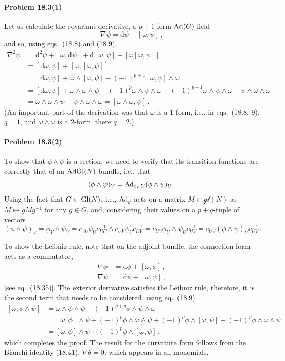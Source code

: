 \documentclass[a4paper,12pt]{article}
\def\d{\mathrm{d}}
\newcommand{\problem}[1]{\paragraph{Problem #1}}
\begin{document}
\problem{18.3(1)} Let us calculate the covariant derivative, a $p+1$-form ${\rm Ad}(G)$ field
\[
 \nabla \psi = \d \psi + [\omega, \psi]\,,
\]
and so, using eqs.\ (18.8) and (18.9),
\[
 \begin{aligned}
  \nabla^2 \psi &= \d^2\psi + [\omega, \d \psi] +\d [\omega, \psi] + [\omega [\omega, \psi]]\\
  &= [\d\omega, \psi] + [\omega, [\omega, \psi]] \\
    &= [\d\omega, \psi] + \omega \wedge [\omega, \psi] - (-1)^{p+1}[\omega, \psi] \wedge \omega \\
  &= [\d\omega, \psi] + \omega \wedge \omega \wedge \psi - (-1)^p \omega \wedge \psi \wedge \omega -(-1)^{p+1} \omega \wedge \psi \wedge \omega - \psi\wedge \omega \wedge \omega\\
  &= \omega \wedge \omega \wedge \psi - \psi\wedge \omega\wedge\omega = [\omega\wedge\omega, \psi]\,.
 \end{aligned}
\]
(An important part of the derivation was that $\omega$ is a 1-form, i.e., in eqs.\ (18.8, 9), $q=1$, and $\omega\wedge\omega$ is a 2-form, there $q=2$.)


\problem{18.3(2)} To show that $\phi\wedge\psi$ is a section, we need to verify that its transition functions are correctly that of an ${\rm Ad}{\rm Gl}(N)$ bundle, i.e., that
\[
 (\phi\wedge\psi)_V = {\rm Ad}_{c_VU} (\phi\wedge\psi)_U\,.
\]
Using the fact that $G\subset {\rm Gl}(N)$, i.e., ${\rm Ad}_g$ acts on a matrix $M\in \mathcal{gl}(N)$ as $M\mapsto g M g^{-1}$ for any $g\in G$, and, considering their values on a $p+q$-tuple of vectors
\[
 (\phi\wedge\psi)_V = \phi_V\wedge\psi_V = c_{VU}\phi_U c_{UC}^{-1} \wedge c_{UV}\psi_U c_{UV}^{-1} =c_{UV}\phi_U\wedge\psi_U c_{UV}^{-1} = c_{UV}(\phi\wedge\psi)_U c_{UV}^{-1}\,.
\]

To show the Leibniz rule, note that on the adjoint bundle, the connection form acts as a commutator,
\[
 \begin{aligned}
  \nabla \phi &= \d\phi + [\omega, \phi]\,,\\
  \nabla \psi &= \d\psi + [\omega, \psi]\,,
 \end{aligned}
\]
[see eq.\ (18.35)]. The exterior derivative satisfies the Leibniz rule, therefore, it is the second term that needs to be considered, using eq.\ (18.9)
\[
 \begin{aligned}{}
  [\omega, \phi\wedge\psi] &= \omega \wedge \phi\wedge\psi - (-1)^{p+q} \phi\wedge\psi\wedge\omega\\
  &= [\omega, \phi]\wedge \psi + (-1)^p \phi\wedge\omega\wedge\psi +(-1)^p \phi\wedge[\omega,\psi] -(-1)^p\phi\wedge\omega\wedge\psi\\
  &= [\omega,\phi]\wedge\psi +(-1)^p\phi\wedge[\omega,\psi]\,,
 \end{aligned}
\]
which completes the proof. The result for the curvature form follows from the Bianchi identity (18.41), $\nabla\theta=0$, which appears in all monomials.
\end{document}
